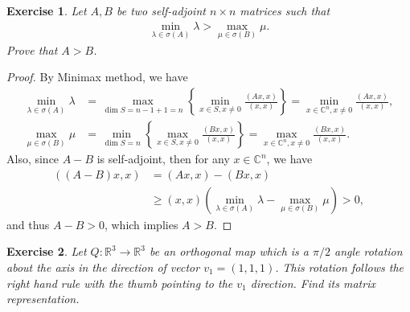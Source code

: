 \documentclass[11pt]{article}
\newtheorem{exercise}{Exercise}[section]
\theoremstyle{definition}
\numberwithin{equation}{subsection}
\begin{document}
\begin{exercise}
Let $A, B$ be two self-adjoint $n \times n$ matrices such that
\begin{align*}
    \min_{\lambda \in \sigma(A)} \lambda > \max_{\mu \in \sigma(B)} \mu.
\end{align*}
Prove that $A > B$.
\end{exercise}
\begin{proof}
By Minimax method, we have
\begin{align*}
    \min_{\lambda \in \sigma(A)} \lambda & = \max_{\dim S = n-1+1=n} \left\{\min_{x\in S, x \neq 0} \frac{(Ax, x)}{(x,x)}\right\} = \min_{x\in \mathbb{C}^n, x \neq 0} \frac{(Ax, x)}{(x,x)}, \\
    \max_{\mu \in \sigma(B)} \mu & = \min_{\dim S = n} \left\{ \max_{x \in S, x \neq 0} \frac{(Bx, x)}{(x,x)}\right\} = \max_{x \in \mathbb{C}^n, x \neq 0} \frac{(Bx, x)}{(x,x)}.
\end{align*}
Also, since $A - B$ is self-adjoint, then for any $x \in \mathbb{C}^n$, we have
\begin{align*}
    ((A - B)x, x) & = (Ax, x) - (Bx, x) \\
    & \geq (x, x) \left(\min_{\lambda \in \sigma(A)} \lambda - \max_{\mu \in \sigma(B)} \mu \right) > 0,
\end{align*}
and thus $A - B > 0$, which implies $A > B$.
\end{proof}

\medskip

\begin{exercise}
Let $Q: \mathbb{R}^3 \to \mathbb{R}^3$ be an orthogonal map which is a $\pi/2$ angle rotation about the axis in the direction of vector $v_1 = (1,1,1)$. This rotation follows the right hand rule with the thumb pointing to the $v_1$ direction. Find its matrix representation.
\end{exercise}

\medskip
\end{document}
